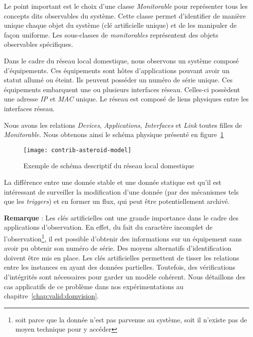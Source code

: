 Le point important est le choix d'une classe \textit{Monitorable} pour représenter tous les concepts dits observables du système. Cette classe permet d'identifier de manière unique chaque objet du système (clé artificielle unique) et de les manipuler de façon uniforme. Les sous-classes de \textit{monitorables} représentent des objets observables spécifiques.

\begin{example}
	Dans le cadre du réseau local domestique, nous observons un système composé d'équipements. Ces équipements sont hôtes d'applications pouvant avoir un statut allumé ou éteint. Ils peuvent posséder un numéro de série unique. Ces équipements embarquent une ou plusieurs interfaces réseau. Celles-ci possèdent une adresse \textit{IP} et \textit{MAC} unique. Le réseau est composé de liens physiques entre les interfaces réseau.
	
	Nous avons les relations \textit{Devices}, \textit{Applications}, \textit{Interfaces} et \textit{Link} toutes filles de \textit{Monitorable}. Nous obtenons ainsi le schéma physique présenté en figure~\ref{fig:contrib:asteroid:theorie:model}
	\begin{figure}[ht]
                \centering
		\texttt{[image: contrib-asteroid-model]}
		\caption{Exemple de schéma descriptif du réseau local domestique}\label{fig:contrib:asteroid:theorie:model}
	\end{figure}
\end{example}

La différence entre une donnée stable et une donnée statique est qu'il est intéressant de surveiller la modification d'une donnée (par des mécanismes tels que les \textit{triggers}) et en former un flux, qui peut être potentiellement archivé.

\textbf{Remarque} : Les clés artificielles ont une grande importance dans le cadre des applications d'observation. En effet, du fait du caractère incomplet de l'observation\footnote{soit parce que la donnée n'est pas parvenue au système, soit il n'existe pas de moyen technique pour y accéder}, il est possible d'obtenir des informations sur un équipement sans avoir pu obtenir son numéro de série. Des moyens alternatifs d'identification doivent être mis en place. Les clés artificielles permettent de tisser les relations entre les instances en ayant des données partielles. Toutefois, des vérifications d'intégrités sont nécessaires pour garder un modèle cohérent. Nous détaillons des cas applicatifs de ce problème dans nos expérimentations au chapitre~\ref{chap:valid:domvision}.

